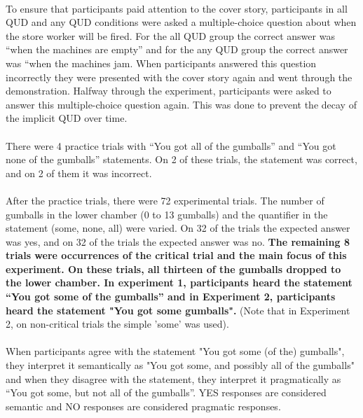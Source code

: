 \documentclass[12pt]{article}
\begin{document}
\paragraph{}To ensure that participants paid attention to the cover story, participants in all QUD and any QUD conditions were asked a multiple-choice question about when the store worker will be fired. For the all QUD group the correct answer was “when the machines are empty” and for the any QUD group the correct answer was “when the machines jam. When participants answered this question incorrectly they were presented with the cover story again and went through the demonstration. Halfway through the experiment, participants were asked to answer this multiple-choice question again. This was done to prevent the decay of the implicit QUD over time. 

\paragraph{}There were 4 practice trials with “You got all of the gumballs” and “You got none of the gumballs” statements. On 2 of these trials, the statement was correct, and on 2 of them it was incorrect. 

\paragraph{}After the practice trials, there were 72 experimental trials. The number of gumballs in the lower chamber (0 to 13 gumballs) and the quantifier in the statement (some, none, all) were varied. On 32 of the trials the expected answer was yes, and on 32 of the trials the expected answer was no. \textbf{The remaining 8 trials were occurrences of the critical trial and the main focus of this experiment. On these trials, all thirteen of the gumballs dropped to the lower chamber. In experiment 1, participants heard the statement “You got some of the gumballs” and in Experiment 2, participants heard the statement "You got some gumballs".} (Note that in Experiment 2, on non-critical trials the simple 'some' was used). 

\paragraph{}When participants agree with the statement "You got some (of the) gumballs", they interpret it semantically as "You got some, and possibly all of the gumballs" and when they disagree with the statement, they interpret it pragmatically as “You got some, but not all of the gumballs”. YES responses are considered semantic and NO responses are considered pragmatic responses.
\end{document}
